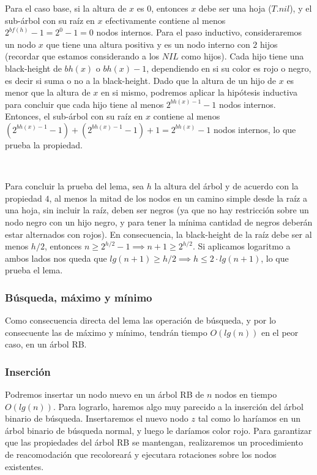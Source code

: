 Para el caso base, si la altura de $x$ es $0$, entonces $x$ debe ser una hoja ($T.nil$), y el sub-\'arbol con su ra\'iz en $x$ efectivamente contiene al menos $2^{bf(h)}-1 = 2^0 -1 = 0$ nodos internos. Para el paso inductivo, consideraremos un nodo $x$ que tiene una altura positiva y es un nodo interno con $2$ hijos (recordar que estamos considerando a los $NIL$ como hijos). Cada hijo tiene una black-height de $bh(x)$ o $bh(x)-1$, dependiendo en si su color es rojo o negro, es decir si suma o no a la black-height. Dado que la altura de un hijo de $x$ es menor que la altura de $x$ en si mismo, podremos aplicar la hip\'otesis inductiva para concluir que cada hijo tiene al menos $2^{bh(x)-1}-1$ nodos internos. Entonces, el sub-\'arbol con su ra\'iz en $x$ contiene al menos $(2^{bh(x)-1}-1) + (2^{bh(x)-1}-1) + 1 = 2^{bh(x)}-1$ nodos internos, lo que prueba la propiedad.

~

Para concluir la prueba del lema, sea $h$ la altura del \'arbol y de acuerdo con la propiedad $4$, al menos la mitad de los nodos en un camino simple desde la ra\'iz a una hoja, sin incluir la ra\'iz, deben ser negros (ya que no hay restricci\'on sobre un nodo negro con un hijo negro, y para tener la m\'inima cantidad de negros deber\'an estar alternados con rojos). En consecuencia, la black-height de la ra\'iz debe ser al menos $h/2$, entonces $n \geq 2^{h/2}-1 \implies n+1 \geq 2^{h/2}$. Si aplicamos logaritmo a ambos lados nos queda que $lg(n+1) \geq h/2 \implies h \leq 2 \cdot lg(n+1)$, lo que prueba el lema.

\subsubsection{B\'usqueda, m\'aximo y m\'inimo}

Como consecuencia directa del lema las operaci\'on de b\'usqueda, y por lo consecuente las de m\'aximo y m\'inimo, tendr\'an tiempo $O(lg(n))$ en el peor caso, en un \'arbol RB.

\subsubsection{Inserci\'on}

Podremos insertar un nodo nuevo en un \'arbol RB de $n$ nodos en tiempo $O(lg(n))$. Para lograrlo, haremos algo muy parecido a la inserci\'on del \'arbol binario de b\'usqueda. Insertaremos el nuevo nodo $z$ tal como lo har\'iamos en un \'arbol binario de b\'usqueda normal, y luego le dar\'iamos color rojo. Para garantizar que las propiedades del \'arbol RB se mantengan, realizaremos un procedimiento de reacomodaci\'on que recolorear\'a y ejecutara rotaciones sobre los nodos existentes.


